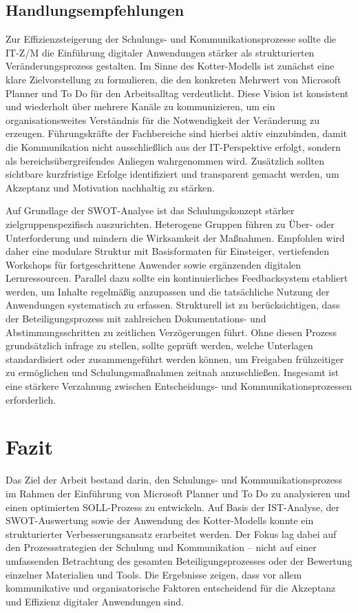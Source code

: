 \documentclass[
    12pt, 
    a4paper,
    ]{scrartcl} %
\begin{document}
\subsection{Handlungsempfehlungen}
Zur Effizienzsteigerung der Schulungs- und Kommunikationsprozesse sollte die IT-Z/M die Einführung digitaler Anwendungen stärker als strukturierten Veränderungsprozess gestalten. Im Sinne des Kotter-Modells ist zunächst eine klare Zielvorstellung zu formulieren, die den konkreten Mehrwert von Microsoft Planner und To Do für den Arbeitsalltag verdeutlicht. Diese Vision ist konsistent und wiederholt über mehrere Kanäle zu kommunizieren, um ein organisationsweites Verständnis für die Notwendigkeit der Veränderung zu erzeugen. Führungskräfte der Fachbereiche sind hierbei aktiv einzubinden, damit die Kommunikation nicht ausschließlich aus der IT-Perspektive erfolgt, sondern als bereichsübergreifendes Anliegen wahrgenommen wird. Zusätzlich sollten sichtbare kurzfristige Erfolge identifiziert und transparent gemacht werden, um Akzeptanz und Motivation nachhaltig zu stärken.

Auf Grundlage der SWOT-Analyse ist das Schulungskonzept stärker zielgruppenspezifisch auszurichten. Heterogene Gruppen führen zu Über- oder Unterforderung und mindern die Wirksamkeit der Maßnahmen. Empfohlen wird daher eine modulare Struktur mit Basisformaten für Einsteiger, vertiefenden Workshops für fortgeschrittene Anwender sowie ergänzenden digitalen Lernressourcen. Parallel dazu sollte ein kontinuierliches Feedbacksystem etabliert werden, um Inhalte regelmäßig anzupassen und die tatsächliche Nutzung der Anwendungen systematisch zu erfassen.
Strukturell ist zu berücksichtigen, dass der Beteiligungsprozess mit zahlreichen Dokumentations- und Abstimmungsschritten zu zeitlichen Verzögerungen führt. Ohne diesen Prozess grundsätzlich infrage zu stellen, sollte geprüft werden, welche Unterlagen standardisiert oder zusammengeführt werden können, um Freigaben frühzeitiger zu ermöglichen und Schulungsmaßnahmen zeitnah anzuschließen. Insgesamt ist eine stärkere Verzahnung zwischen Entscheidungs- und Kommunikationsprozessen erforderlich.

\section{Fazit}
Das Ziel der Arbeit bestand darin, den Schulungs- und Kommunikationsprozess im Rahmen der Einführung von Microsoft Planner und To Do zu analysieren und einen optimierten SOLL-Prozess zu entwickeln. Auf Basis der IST-Analyse, der SWOT-Auswertung sowie der Anwendung des Kotter-Modells konnte ein strukturierter Verbesserungsansatz erarbeitet werden. Der Fokus lag dabei auf den Prozessstrategien der Schulung und Kommunikation – nicht auf einer umfassenden Betrachtung des gesamten Beteiligungsprozesses oder der Bewertung einzelner Materialien und Tools. Die Ergebnisse zeigen, dass vor allem kommunikative und organisatorische Faktoren entscheidend für die Akzeptanz und Effizienz digitaler Anwendungen sind.
\end{document}
